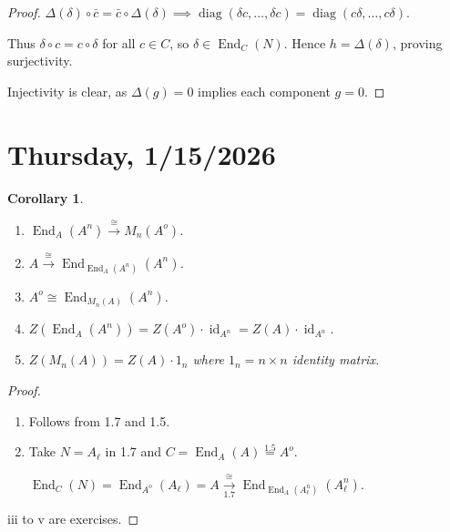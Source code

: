 \documentclass{article}
\theoremstyle{definition}
\theoremstyle{plain}
\newtheorem{corollary}[theorem]{Corollary}
\theoremstyle{remark}
\begin{document}
\begin{proof}
        \(\Delta(\delta) \circ \bar{c} = \bar{c} \circ \Delta(\delta) \implies \operatorname{diag}(\delta c, \dots, \delta c) = \operatorname{diag}(c \delta, \dots, c \delta)\).
        
        Thus \(\delta \circ c = c \circ \delta\) for all \(c \in C\), so \(\delta \in \operatorname{End}_C(N)\). Hence \(h = \Delta(\delta)\), proving surjectivity.
        
        Injectivity is clear, as \(\Delta(g)=0\) implies each component \(g=0\).

    \end{proof}

    \section*{Thursday, 1/15/2026}
    
    \begin{corollary}
        \begin{enumerate}[label=\roman*)]
            \item \(\operatorname{End}_A(A^n) \xrightarrow{\cong} M_n(A^o)\).
            \item \(A \xrightarrow{\cong} \operatorname{End}_{\operatorname{End}_A(A^n)}(A^n)\).
            \item \(A^o \cong \operatorname{End}_{M_n(A)}(A^n)\).
            \item \(Z \left( \operatorname{End}_A(A^n) \right) = Z(A^o) \cdot \operatorname{id}_{A^n} = Z(A) \cdot \operatorname{id}_{A^n}\).
            \item \(Z(M_n(A)) = Z(A) \cdot 1_n\) where \(1_n = n \times n\) identity matrix.
        \end{enumerate} 
    \end{corollary}

    \begin{proof}
        \begin{enumerate}[label=\roman*)]
            \item Follows from 1.7 and 1.5.
            \item Take \(N = A_\ell\) in 1.7 and \(C = \operatorname{End}_A(A) \overset{1.5}{=} A^o\).
            
            \(\operatorname{End}_C(N) = \operatorname{End}_{A^o}(A_\ell) = A \xrightarrow[1.7]{\cong} \operatorname{End}_{\operatorname{End}_A(A^n_\ell)}(A^n_\ell)\).  
        \end{enumerate} 

        iii to v are exercises.
    \end{proof}
\end{document}
